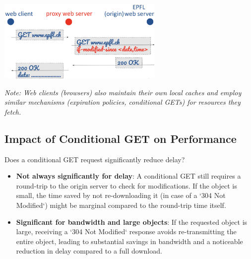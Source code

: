 \documentclass[../../compsys.tex]{subfiles}
\begin{document}
\begin{center}
    \includegraphics[width=0.6\textwidth]{images/cache-age.png} %
\end{center}
\textit{Note: Web clients (browsers) also maintain their own local caches and employ similar mechanisms (expiration policies, conditional GETs) for resources they fetch.}

\subsection{Impact of Conditional GET on Performance}
Does a conditional GET request significantly reduce delay?
\begin{itemize}
    \item \textbf{Not always significantly for delay}: A conditional GET still requires a round-trip to the origin server to check for modifications. If the object is small, the time saved by not re-downloading it (in case of a `304 Not Modified`) might be marginal compared to the round-trip time itself.
    \item \textbf{Significant for bandwidth and large objects}: If the requested object is large, receiving a `304 Not Modified` response avoids re-transmitting the entire object, leading to substantial savings in bandwidth and a noticeable reduction in delay compared to a full download.
\end{itemize}
\end{document}
